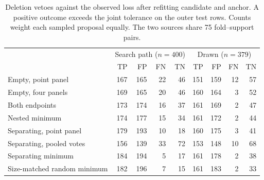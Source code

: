 \begin{table}[tb]
\centering
\caption{Deletion vetoes against the observed loss after refitting candidate and anchor. A positive outcome exceeds the joint tolerance on the outer test rows. Counts weight each sampled proposal equally. The two sources share 75 fold--support pairs.}
\label{tab:refits}
\small\setlength{\tabcolsep}{2.5pt}
\begin{tabular}{@{}lrrrr@{\quad}rrrr@{}}
\toprule
 & \multicolumn{4}{c}{Search path ($n=400$)} & \multicolumn{4}{c}{Drawn ($n=379$)} \\
 & TP & FP & FN & TN & TP & FP & FN & TN \\
\midrule
Empty, point panel & 167 & 165 & 22 & 46 & 151 & 159 & 12 & 57 \\
Empty, four panels & 169 & 165 & 20 & 46 & 160 & 164 & 3 & 52 \\
Both endpoints & 173 & 174 & 16 & 37 & 161 & 169 & 2 & 47 \\
Nested minimum & 174 & 177 & 15 & 34 & 161 & 172 & 2 & 44 \\
Separating, point panel & 179 & 193 & 10 & 18 & 160 & 175 & 3 & 41 \\
Separating, pooled votes & 156 & 139 & 33 & 72 & 153 & 148 & 10 & 68 \\
Separating minimum & 184 & 194 & 5 & 17 & 161 & 178 & 2 & 38 \\
Size-matched random minimum & 182 & 196 & 7 & 15 & 161 & 183 & 2 & 33 \\
\bottomrule
\end{tabular}
\end{table}
